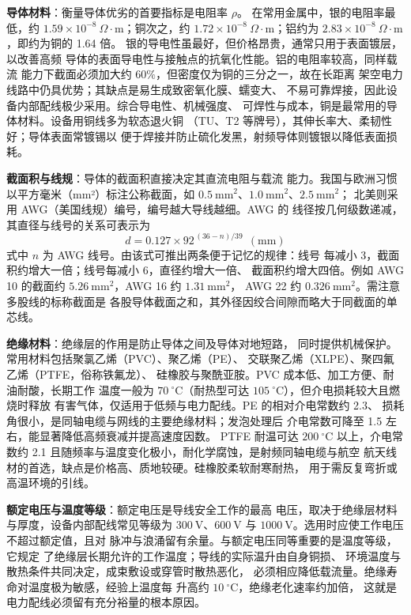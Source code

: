 \textbf{导体材料}：衡量导体优劣的首要指标是电阻率 $\rho$。
在常用金属中，银的电阻率最低，约
$1.59\times10^{-8}\ \Omega\cdot\mathrm{m}$；铜次之，约
$1.72\times10^{-8}\ \Omega\cdot\mathrm{m}$；铝约为
$2.83\times10^{-8}\ \Omega\cdot\mathrm{m}$，即约为铜的 1.64 倍。
银的导电性虽最好，但价格昂贵，通常只用于表面镀层，以改善高频
导体的表面导电性与接触点的抗氧化性能。铝的电阻率较高，同样载流
能力下截面必须加大约 $60\%$，但密度仅为铜的三分之一，故在长距离
架空电力线路中仍具优势；其缺点是易生成致密氧化膜、蠕变大、
不易可靠焊接，因此设备内部配线极少采用。综合导电性、机械强度、
可焊性与成本，铜是最常用的导体材料。设备用铜线多为软态退火铜
（TU、T2 等牌号），其伸长率大、柔韧性好；导体表面常镀锡以
便于焊接并防止硫化发黑，射频导体则镀银以降低表面损耗。

\textbf{截面积与线规}：导体的截面积直接决定其直流电阻与载流
能力。我国与欧洲习惯以平方毫米（mm²）标注公称截面，如
$0.5\ \mathrm{mm}^2$、$1.0\ \mathrm{mm}^2$、$2.5\ \mathrm{mm}^2$；
北美则采用 AWG（美国线规）编号，编号越大导线越细。AWG 的
线径按几何级数递减，其直径与线号的关系可表示为
\begin{equation}
d = 0.127 \times 92^{\,(36-n)/39} \ \ (\mathrm{mm})
\end{equation}
式中 $n$ 为 AWG 线号。由该式可推出两条便于记忆的规律：线号
每减小 3，截面积约增大一倍；线号每减小 6，直径约增大一倍、
截面积约增大四倍。例如 AWG 10 的截面约
$5.26\ \mathrm{mm}^2$，AWG 16 约 $1.31\ \mathrm{mm}^2$，
AWG 22 约 $0.326\ \mathrm{mm}^2$。需注意多股线的标称截面是
各股导体截面之和，其外径因绞合间隙而略大于同截面的单芯线。

\textbf{绝缘材料}：绝缘层的作用是防止导体之间及导体对地短路，
同时提供机械保护。常用材料包括聚氯乙烯（PVC）、聚乙烯（PE）、
交联聚乙烯（XLPE）、聚四氟乙烯（PTFE，俗称铁氟龙）、
硅橡胶与聚酰亚胺。PVC 成本低、加工方便、耐油耐酸，长期工作
温度一般为 $70\ ^{\circ}\mathrm{C}$（耐热型可达
$105\ ^{\circ}\mathrm{C}$），但介电损耗较大且燃烧时释放
有害气体，仅适用于低频与电力配线。PE 的相对介电常数约 2.3、
损耗角很小，是同轴电缆与网线的主要绝缘材料；发泡处理后
介电常数可降至 1.5 左右，能显著降低高频衰减并提高速度因数。
PTFE 耐温可达 $200\ ^{\circ}\mathrm{C}$ 以上，介电常数约 2.1
且随频率与温度变化极小，耐化学腐蚀，是射频同轴电缆与航空
航天线材的首选，缺点是价格高、质地较硬。硅橡胶柔软耐寒耐热，
用于需反复弯折或高温环境的引线。

\textbf{额定电压与温度等级}：额定电压是导线安全工作的最高
电压，取决于绝缘层材料与厚度，设备内部配线常见等级为
$300\ \mathrm{V}$、$600\ \mathrm{V}$ 与
$1000\ \mathrm{V}$。选用时应使工作电压不超过额定值，且对
脉冲与浪涌留有余量。与额定电压同等重要的是温度等级，它规定
了绝缘层长期允许的工作温度；导线的实际温升由自身铜损、
环境温度与散热条件共同决定，成束敷设或穿管时散热恶化，
必须相应降低载流量。绝缘寿命对温度极为敏感，经验上温度每
升高约 $10\ ^{\circ}\mathrm{C}$，绝缘老化速率约加倍，
这就是电力配线必须留有充分裕量的根本原因。

